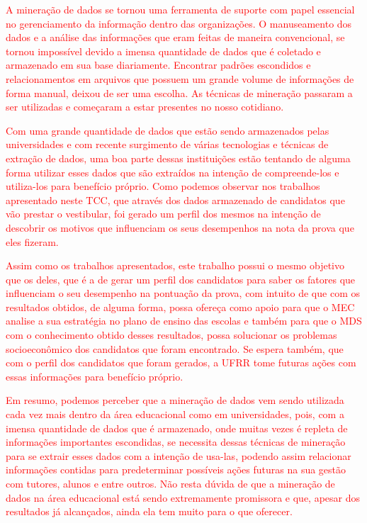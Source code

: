 \label{chapter:consideracoes}


\par 
\textcolor{red}{A mineração de dados se tornou uma ferramenta de suporte com papel essencial no gerenciamento da informação dentro das organizações. O manuseamento dos dados e a análise das informações que eram feitas de maneira convencional, se tornou impossível devido a imensa quantidade de dados que é coletado e armazenado em sua base diariamente. Encontrar padrões escondidos e relacionamentos em arquivos que possuem um grande volume de informações de forma manual, deixou de ser uma escolha. As técnicas de mineração passaram a ser utilizadas e começaram a estar presentes no nosso cotidiano.}

\par
\textcolor{red}{Com uma grande quantidade de dados que estão sendo armazenados pelas universidades e com recente surgimento de várias tecnologias e técnicas de extração de dados, uma boa parte dessas instituições estão tentando de alguma forma utilizar esses dados que são extraídos  na intenção de compreende-los e utiliza-los para benefício próprio. Como podemos observar nos trabalhos apresentado neste TCC, que através dos dados armazenado de candidatos que vão prestar o vestibular, foi gerado um perfil dos mesmos na intenção de descobrir os motivos que influenciam os seus desempenhos na nota da prova que eles fizeram.}

\par
\textcolor{red}{Assim como os trabalhos apresentados, este trabalho possui o mesmo objetivo que os deles, que é a de gerar um perfil dos candidatos para saber os fatores que influenciam o seu desempenho na pontuação da prova, com intuito de que com os resultados obtidos, de alguma forma, possa ofereça como apoio para que o MEC analise a sua estratégia no plano de ensino das escolas e também para que o MDS com o conhecimento obtido desses resultados, possa solucionar os problemas socioeconômico dos candidatos que foram encontrado. Se espera também, que com o perfil dos candidatos que foram gerados, a UFRR tome futuras ações com essas informações para benefício próprio.}

\textcolor{red}{Em resumo, podemos perceber que a mineração de dados vem sendo utilizada cada vez mais dentro da área educacional como em universidades, pois, com a imensa quantidade de dados que é armazenado, onde muitas vezes é repleta de informações importantes escondidas, se necessita dessas técnicas de mineração para se extrair esses dados com a intenção de usa-las, podendo assim relacionar informações contidas para predeterminar possíveis ações futuras na sua gestão com tutores, alunos e entre outros. Não resta dúvida de que a mineração de dados na área educacional está sendo extremamente promissora e que, apesar dos resultados já alcançados, ainda ela tem muito para o que oferecer.}

